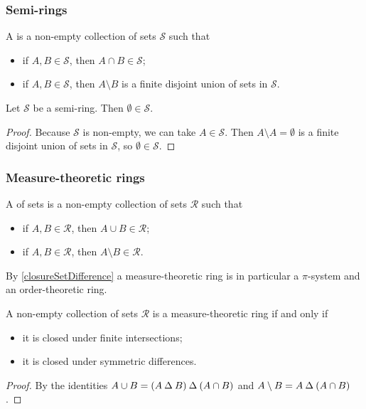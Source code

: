\subsubsection{Semi-rings}
\begin{definition}
A  is a non-empty collection of sets $\mathcal{S}$ such that
\begin{itemize}
\item if $A,B\in \mathcal{S}$, then $A\cap B\in \mathcal{S}$;
\item if $A,B\in \mathcal{S}$, then $A\setminus B$ is a finite disjoint union of sets in $\mathcal{S}$.
\end{itemize}
\end{definition}

\begin{lemma}
Let $\mathcal{S}$ be a semi-ring. Then $\emptyset \in \mathcal{S}$.
\end{lemma}
\begin{proof}
Because $\mathcal{S}$ is non-empty, we can take $A\in \mathcal{S}$. Then $A\setminus A = \emptyset$ is a finite disjoint union of sets in $\mathcal{S}$, so $\emptyset \in \mathcal{S}$.
\end{proof}

\subsubsection{Measure-theoretic rings}
\begin{definition}
A  of sets is a non-empty collection of sets $\mathcal{R}$ such that
\begin{itemize}
\item if $A,B\in \mathcal{R}$, then $A\cup B\in \mathcal{R}$;
\item if $A,B\in \mathcal{R}$, then $A\setminus B\in \mathcal{R}$.
\end{itemize}
\end{definition}
By \ref{closureSetDifference} a measure-theoretic ring is in particular a $\pi$-system and an order-theoretic ring.

\begin{lemma}
A non-empty collection of sets $\mathcal{R}$ is a measure-theoretic ring \textup{if and only if}
\begin{itemize}
\item it is closed under finite intersections;
\item it is closed under symmetric differences.
\end{itemize}
\end{lemma}
\begin{proof}
By the identities $A\cup B = (A\mathbin{\Delta} B)\mathbin{\Delta} (A\cap B)$ and $A\setminus B = A\mathbin{\Delta} (A\cap B)$.
\end{proof}

